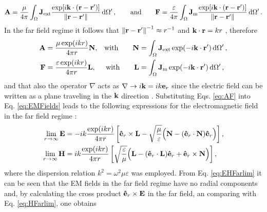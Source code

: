%
\begin{align}
    \vb{A} = \frac{\mu}{4\pi} \int_\Omega \vb{J}_\text{ext}  \frac{\exp[i\vb{k}\cdot(\vb{r}-\vb{r}')]}{\norm{\vb{r}-\vb{r}'}}\dd{\Omega'},
    \qquad
    \text{and}
    \qquad
    \vb{F} = \frac{\varepsilon}{4\pi} \int_\Omega \vb{J}_\text{m}  \frac{\exp[i\vb{k}\cdot(\vb{r}-\vb{r}')]}{\norm{\vb{r}-\vb{r}'}}\dd{\Omega'}.
\end{align}
%
In the far field regime it follows that $\norm{\vb{r}-\vb{r}'}^{-1}\approx r^{-1}$ and $\vb{k}\cdot \vb{r} = kr$ \cite{jackson_classical_1999,zangwill_modern_2013}, therefore
%
\begin{subequations}
    \label{eq:AF}
\begin{align}
    \vb{A} &= \frac{\mu\exp(ikr)}{4\pi r}\vb{N},         &\text{with} \qquad \vb{N} &= \int_\Omega \vb{J}_\text{ext}  \exp(-i\vb{k}\cdot\vb{r}')\dd{\Omega'},\\
    \vb{F} &= \frac{\varepsilon\exp(ikr)}{4\pi r}\vb{L}, &\text{with} \qquad \vb{L} &= \int_\Omega \vb{J}_\text{m}  \exp(-i\vb{k}\cdot\vb{r}')\dd{\Omega'},
\end{align}
\end{subequations}
%
and that also the operator $\nabla$ acts as $\nabla\to i\vb{k} = ik\vb{e}_r$ since the electric field can be written as a plane traveling in the $\vb{k}$ direction \cite{jin_theory_2010,jackson_classical_1999}. Substituting Eqs. \eqref{eq:AF} into Eq. \eqref{eq:EMFields} leads to the following expressions for the electromagnetic field in the far field regime \cite{jin_theory_2010}:
%
\begin{subequations}
    \label{eq:EHFarlim}
\begin{align}
    \lim_{r\to\infty}\vb{E} &= -i k\frac{\exp(ikr)}{4\pi r}
                \left[ \vu{e}_r\times\vb{L}-\sqrt{\frac{\mu}{\varepsilon}}  \Big(\vb{N}-(\vu{e}_r\cdot\vb{N})\vu{e}_r\Big) \right],
            \label{eq:EFarlim}\\
    \lim_{r\to\infty}\vb{H} &=i k\frac{\exp(ikr)}{4\pi r}
                \left[\sqrt{\frac{\varepsilon}{\mu}}  \Big(\vb{L}-(\vu{e}_r\cdot\vb{L})\vu{e}_r + \vu{e}_r\times\vb{N}\Big) \right],
             \label{eq:HFarlim}
\end{align}
\end{subequations}
%
where the dispersion relation $k^2 = \omega^2\mu\varepsilon$ was employed. From Eq. \eqref{eq:EHFarlim} it can be seen that the EM fields in the far field regime have no radial components and, by calculating the cross product $\vu{e}_r\times\vb{E}$ in the far field, an comparing with Eq. \eqref{eq:HFarlim}, one obtains
